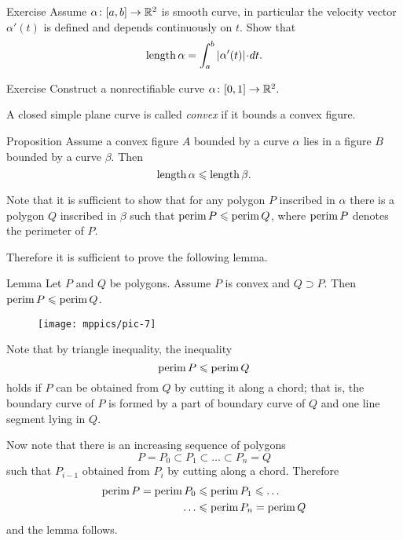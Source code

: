 \begin{thm}{Exercise}
Assume $\alpha\colon[a,b]\to\mathbb{R}^2$ is smooth curve, in particular the velocity vector $\alpha'(t)$ is defined and depends continuously on $t$.
Show that
\[\length \alpha=\int_a^b|\alpha'(t)|\cdot dt.\]
\end{thm}

\begin{thm}{Exercise}\label{ex:nonrectifiable-curve}
Construct a nonrectifiable curve $\alpha\colon[0,1]\to\mathbb{R}^2$.
\end{thm}

A closed simple plane curve is called \emph{convex} if it bounds a convex figure.

\begin{thm}{Proposition}\label{prop:convex-curve}
Assume a convex figure $A$ bounded by a curve $\alpha$ lies in a figure $B$ bounded by a curve $\beta$.
Then
\[\mathop{\rm length}\nolimits\alpha\leqslant \mathop{\rm length}\nolimits\beta.\]
\end{thm}

Note that it is sufficient to show that for any polygon  $P$ inscribed in $\alpha$ there is a polygon $Q$ inscribed in $\beta$ such that 
$\mathop{\rm perim}\nolimits P\leqslant \mathop{\rm perim}\nolimits Q$, where $\mathop{\rm perim}\nolimits P$ denotes the perimeter of $P$.

Therefore it is sufficient to prove the following lemma.

\begin{thm}{Lemma}\label{lem:perimeter}
Let $P$ and $Q$ be polygons.
Assume $P$ is convex and $Q\supset P$.
Then $\mathop{\rm perim}\nolimits P\leqslant \mathop{\rm perim}\nolimits Q$.
\end{thm}

\begin{wrapfigure}{r}{24 mm}
\vskip-4mm
\centering
\texttt{[image: mppics/pic-7]}
\end{wrapfigure}

Note that by triangle inequality,
the inequality
\[\mathop{\rm perim}\nolimits P\leqslant \mathop{\rm perim}\nolimits Q\]
holds
if $P$ can be obtained from $Q$ by cutting it along a chord;
that is, the boundary curve of $P$ is formed by a part of boundary curve of $Q$ and one line segment lying in $Q$.




Now note that there is an increasing sequence of polygons 
$$P=P_0\subset P_1\subset\dots\subset P_n=Q$$
such that $P_{i-1}$ obtained from $P_{i}$ by cutting along a chord.
Therefore 
\begin{align*}
\mathop{\rm perim}\nolimits P=\mathop{\rm perim}\nolimits P_0&\leqslant\mathop{\rm perim}\nolimits P_1\leqslant\dots
\\
\dots&\leqslant\mathop{\rm perim}\nolimits P_n=\mathop{\rm perim}\nolimits Q
\end{align*}
and the lemma follows.
\qeds

